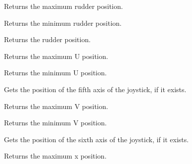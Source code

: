 
Returns the maximum rudder position.

\label{wxjoystickgetruddermin}


Returns the minimum rudder position.

\label{wxjoystickgetrudderposition}


Returns the rudder position.

\label{wxjoystickgetumax}


Returns the maximum U position.

\label{wxjoystickgetumin}


Returns the minimum U position.

\label{wxjoystickgetuposition}


Gets the position of the fifth axis of the joystick, if it exists.

\label{wxjoystickgetvmax}


Returns the maximum V position.

\label{wxjoystickgetvmin}


Returns the minimum V position.

\label{wxjoystickgetvposition}


Gets the position of the sixth axis of the joystick, if it exists.

\label{wxjoystickgetxmax}


Returns the maximum x position.

\label{wxjoystickgetxmin}

